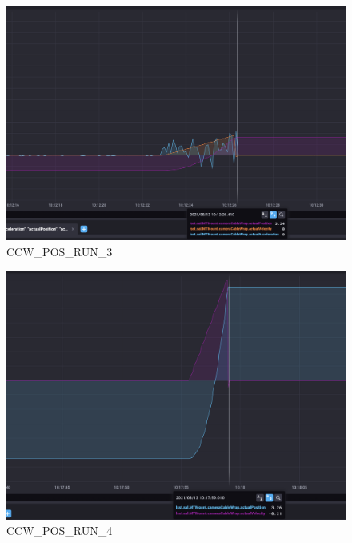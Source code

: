\documentclass[SE,authoryear,toc, lsstdraft]{lsstdoc}
\begin{document}
\begin{figure}
  \includegraphics[width=\linewidth]{media/ccw_pos_3.png}
  \caption{CCW\_POS\_RUN\_3}
  \label{fig:CCW_POS_RUN_3}
\end{figure}
\newpage
\begin{figure}
  \includegraphics[width=\linewidth]{media/ccw_pos_4.png}
  \caption{CCW\_POS\_RUN\_4}
  \label{fig:CCW_POS_RUN_4}
\end{figure}
\newpage
\end{document}
